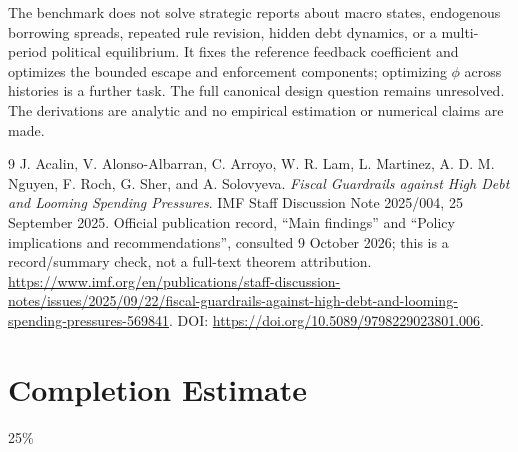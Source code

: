 \documentclass[11pt]{article}
\theoremstyle{remark}
\begin{document}
The benchmark does not solve strategic reports about macro states,
endogenous borrowing spreads, repeated rule revision, hidden debt dynamics,
or a multi-period political equilibrium. It fixes the reference feedback
coefficient and optimizes the bounded escape and enforcement components;
optimizing $\phi$ across histories is a further task. The full canonical
design question remains unresolved. The derivations are analytic and no
empirical estimation or numerical claims are made.

\begin{thebibliography}{9}
 J. Acalin, V. Alonso-Albarran, C. Arroyo,
W. R. Lam, L. Martinez, A. D. M. Nguyen, F. Roch, G. Sher,
and A. Solovyeva. \emph{Fiscal Guardrails against High Debt and Looming
Spending Pressures}. IMF Staff Discussion Note 2025/004,
25 September 2025. Official publication record, ``Main findings'' and
``Policy implications and recommendations'', consulted 9 October 2026;
this is a record/summary check, not a full-text theorem attribution.
\url{https://www.imf.org/en/publications/staff-discussion-notes/issues/2025/09/22/fiscal-guardrails-against-high-debt-and-looming-spending-pressures-569841}.
DOI: \url{https://doi.org/10.5089/9798229023801.006}.
\end{thebibliography}

\section{Completion Estimate}
25\%
\end{document}
